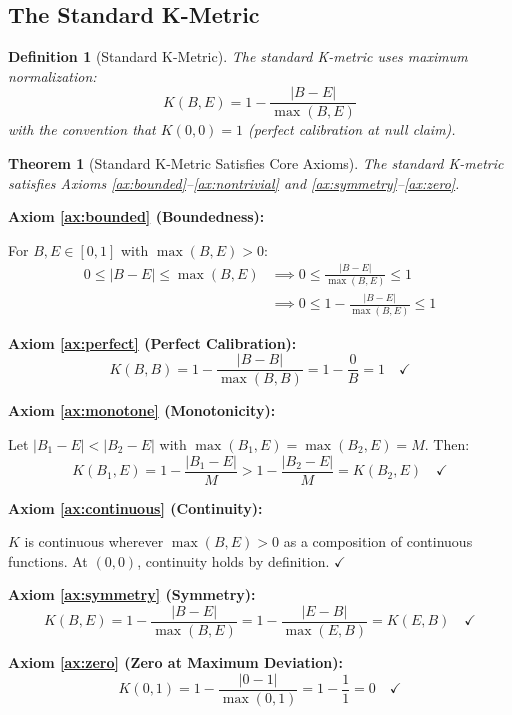\documentclass[11pt,a4paper]{article}
\newtheorem{definition}{Definition}[section]
\newtheorem{theorem}{Theorem}[section]
\theoremstyle{remark}
\begin{document}
\subsection{The Standard K-Metric}

\begin{definition}[Standard K-Metric]
\label{def:k-standard}
The standard K-metric uses maximum normalization:
\begin{equation}
K(B, E) = 1 - \frac{|B - E|}{\max(B, E)}
\end{equation}
with the convention that $K(0, 0) = 1$ (perfect calibration at null claim).
\end{definition}

\begin{theorem}[Standard K-Metric Satisfies Core Axioms]
\label{thm:k-axioms}
The standard K-metric satisfies Axioms \ref{ax:bounded}--\ref{ax:nontrivial} and \ref{ax:symmetry}--\ref{ax:zero}.
\end{theorem}

\begin{proofbox}
\textbf{Axiom \ref{ax:bounded} (Boundedness):}

For $B, E \in [0,1]$ with $\max(B, E) > 0$:
\begin{align}
0 \leq |B - E| \leq \max(B, E) &\implies 0 \leq \frac{|B - E|}{\max(B, E)} \leq 1 \\
&\implies 0 \leq 1 - \frac{|B - E|}{\max(B, E)} \leq 1
\end{align}

\textbf{Axiom \ref{ax:perfect} (Perfect Calibration):}
\begin{equation}
K(B, B) = 1 - \frac{|B - B|}{\max(B, B)} = 1 - \frac{0}{B} = 1 \quad \checkmark
\end{equation}

\textbf{Axiom \ref{ax:monotone} (Monotonicity):}

Let $|B_1 - E| < |B_2 - E|$ with $\max(B_1, E) = \max(B_2, E) = M$. Then:
\begin{equation}
K(B_1, E) = 1 - \frac{|B_1 - E|}{M} > 1 - \frac{|B_2 - E|}{M} = K(B_2, E) \quad \checkmark
\end{equation}

\textbf{Axiom \ref{ax:continuous} (Continuity):}

$K$ is continuous wherever $\max(B, E) > 0$ as a composition of continuous functions. At $(0, 0)$, continuity holds by definition. $\checkmark$

\textbf{Axiom \ref{ax:symmetry} (Symmetry):}
\begin{equation}
K(B, E) = 1 - \frac{|B - E|}{\max(B, E)} = 1 - \frac{|E - B|}{\max(E, B)} = K(E, B) \quad \checkmark
\end{equation}

\textbf{Axiom \ref{ax:zero} (Zero at Maximum Deviation):}
\begin{equation}
K(0, 1) = 1 - \frac{|0 - 1|}{\max(0, 1)} = 1 - \frac{1}{1} = 0 \quad \checkmark
\end{equation}
\end{proofbox}
\end{document}
